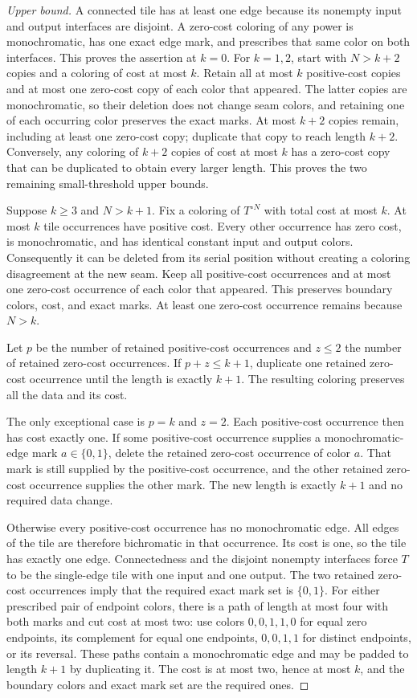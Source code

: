 \begin{proof}[Upper bound]
A connected tile has at least one edge because its nonempty input and output
interfaces are disjoint.  A zero-cost coloring of any power is monochromatic,
has one exact edge mark, and prescribes that same color on both interfaces.
This proves the assertion at $k=0$.  For $k=1,2$, start with $N>k+2$
copies and a coloring of cost at most $k$.  Retain all at most $k$
positive-cost copies and at most one zero-cost copy of each color that
appeared.  The latter copies are monochromatic, so their deletion does not
change seam colors, and retaining one of each occurring color preserves
the exact marks.  At most $k+2$ copies remain, including at least one
zero-cost copy; duplicate that copy to reach length $k+2$.  Conversely,
any coloring of $k+2$ copies of cost at most $k$ has a zero-cost copy
that can be duplicated to obtain every larger length.  This proves the
two remaining small-threshold upper bounds.

Suppose $k\geq3$ and $N>k+1$.  Fix a coloring of $T^{\circ N}$ with total
cost at most $k$.  At most $k$ tile occurrences have positive cost.  Every
other occurrence has zero cost, is monochromatic, and has identical constant
input and output colors.  Consequently it can be deleted from its serial
position without creating a coloring disagreement at the new seam.
Keep all positive-cost occurrences and at most one zero-cost occurrence of
each color that appeared.  This preserves boundary colors, cost, and exact
marks.  At least one zero-cost occurrence remains because $N>k$.

Let $p$ be the number of retained positive-cost occurrences and $z\leq2$
the number of retained zero-cost occurrences.  If $p+z\leq k+1$, duplicate
one retained zero-cost occurrence until the length is exactly $k+1$.
The resulting coloring preserves all the data and its cost.

The only exceptional case is $p=k$ and $z=2$.  Each positive-cost occurrence
then has cost exactly one.  If some positive-cost occurrence supplies a
monochromatic-edge mark $a\in\{0,1\}$, delete the retained zero-cost
occurrence of color $a$.  That mark is still supplied by the positive-cost
occurrence, and the other retained zero-cost occurrence supplies the other
mark.  The new length is exactly $k+1$ and no required data change.

Otherwise every positive-cost occurrence has no monochromatic edge.  All
edges of the tile are therefore bichromatic in that occurrence.  Its cost
is one, so the tile has exactly one edge.  Connectedness and the disjoint
nonempty interfaces force $T$ to be the single-edge tile with one input and
one output.  The two retained zero-cost occurrences imply that the required
exact mark set is $\{0,1\}$.  For either prescribed pair of endpoint colors,
there is a path of length at most four with both marks and cut cost at most
two: use colors $0,0,1,1,0$ for equal zero endpoints, its complement for
equal one endpoints, $0,0,1,1$ for distinct endpoints, or its reversal.
These paths contain a monochromatic edge and may be padded to length $k+1$
by duplicating it.  The cost is at most two, hence at most $k$, and the
boundary colors and exact mark set are the required ones.


\end{proof}
